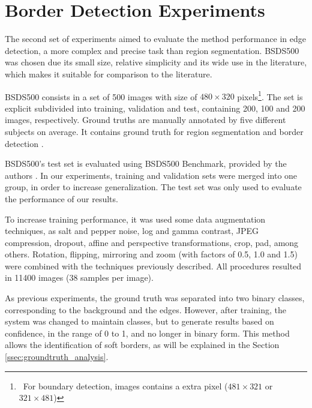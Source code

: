 \section{Border Detection Experiments}
\label{cap6_result_experm_2}

The second set of experiments aimed to evaluate the method performance  in edge detection, a more complex and precise task than region segmentation.
BSDS500 was chosen due its small size, relative simplicity and its wide use in the literature, which makes it suitable for comparison to the literature.

BSDS500 consists in a set of 500 images with size of $480 \times 320$ pixels\footnote{~For boundary detection, images contains a extra pixel ($481 \times 321$ or $321 \times 481$)}.
The set is explicit subdivided into training, validation and test, containing 200, 100 and 200 images, respectively.
Ground truths are manually annotated by five different subjects on average. 
It contains ground truth for region segmentation and border detection \cite{amfm_pami2011}.

BSDS500's test set is evaluated using BSDS500 Benchmark, provided by the authors \cite{amfm_pami2011}.
In our experiments, training and validation sets were merged into one group, in order to increase generalization.
The test set was only used to evaluate the performance of our results.

To increase training performance, it was used some data augmentation techniques, as salt and pepper noise, log and gamma contrast, JPEG compression, dropout, affine and perspective transformations, crop, pad, among others.
Rotation, flipping, mirroring and zoom (with factors of 0.5, 1.0 and 1.5) were combined with the techniques previously described.
All procedures resulted in 11400 images (38 samples per image).%

As previous experiments, the ground truth was separated into two binary classes, corresponding to the background and the edges.
However, after training, the system was changed to maintain classes, but to generate results based on confidence, in the range of 0 to 1, and no longer in binary form.
This method allows the identification of soft borders, as will be explained in the Section \ref{ssec:groundtruth_analysis}.%

